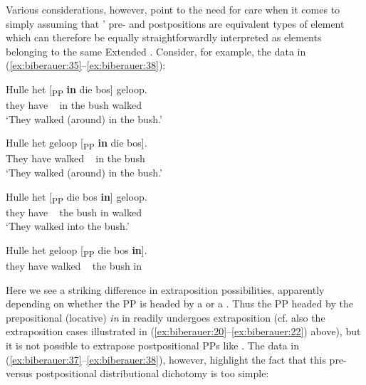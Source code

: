 \documentclass[output=paper]{LSP/langsci}
\begin{document}
Various considerations, however, point to the need for care when it comes to simply assuming that ’ pre- and postpositions are equivalent types of element which can therefore be equally straightforwardly interpreted as elements belonging to the same Extended . Consider, for example, the data in (\ref{ex:biberauer:35}--\ref{ex:biberauer:38}):

\ea%
    \label{ex:biberauer:35}
     

	 \ea \label{ex:biberauer:35a}
\gll Hulle het [\textsubscript{PP} \textbf{in} die bos] geloop.\\
  they   have   ~ in the bush walked\\
\glt ‘They walked (around) in the bush.’

 \ex  \label{ex:biberauer:35b}
\gll Hulle het   geloop [\textsubscript{PP} \textbf{in} die bos].\\
  They have walked ~    in the bush\\
\glt ‘They walked (around) in the bush.’
\z
\z

\ea%
    \label{ex:biberauer:36}
	 \ea \label{ex:biberauer:36a}
\gll Hulle het   [\textsubscript{PP} die bos    \textbf{in}] geloop.{\rmfnm} \\
    they   have ~    the bush   in  walked\\
  \glt ‘They walked into the bush.’

 \ex \label{ex:biberauer:36b}
\gll  *Hulle het   geloop [\textsubscript{PP}  die bos   \textbf{in}].\\
      they   have walked   ~   the bush in\\
\z
\z
{} 

Here we see a striking difference in extraposition possibilities, apparently depending on whether the PP is headed by a  or a . Thus the PP headed by the prepositional (locative) \textit{in} in  readily undergoes extraposition (cf. also the extraposition cases illustrated in (\ref{ex:biberauer:20}--\ref{ex:biberauer:22}) above), but it is not possible to extrapose postpositional PPs like . The data in (\ref{ex:biberauer:37}--\ref{ex:biberauer:38}), however, highlight the fact that this pre- versus postpositional distributional dichotomy is too simple:
\end{document}
